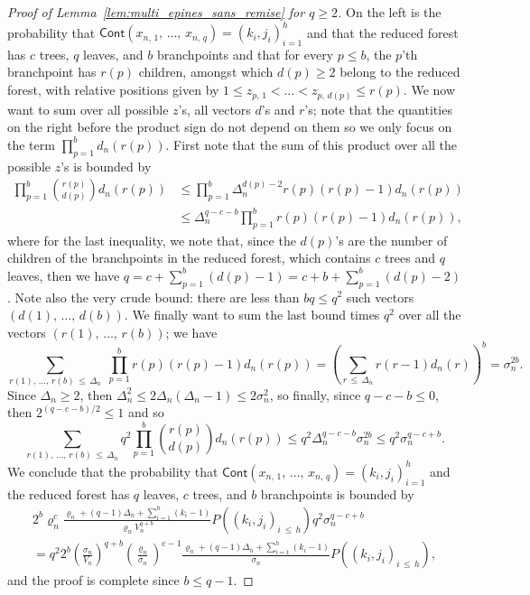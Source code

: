 \documentclass[AHL,Unicode,longabstracts,published]{cedram}
\newcommand{\1}{\ensembles{1}}
\renewcommand{\le}{\leqslant}
\renewcommand{\ge}{\geqslant}
\newcommand{\Cont}{\mathsf{Cont}}
\newcommand{\vertices}{V}
\begin{document}
\begin{proof}[Proof of Lemma~\ref{lem:multi_epines_sans_remise} for $q \ge 2$]
On the left is the probability that $\Cont(x_{n,\,1}, \,\dots,\,x_{n,\,q}) = (k_i, j_i)_{i=1}^h$ and that the reduced forest has $c$ trees, $q$ leaves, and $b$ branchpoints and that for every $p \le b$, the $p$'th branchpoint has $r(p)$ children, amongst which $d(p) \ge 2$ belong to the reduced forest, with relative positions given by $1 \le z_{p,\,1} < \dots < z_{p,\,d(p)} \le r(p)$. We now want to sum over all possible $z$'s, all vectors $d$'s and $r$'s; note that the quantities on the right before the product sign do not depend on them so we only focus on the term $\prod_{p=1}^b d_n(r(p))$. First note that the sum of this product over all the possible $z$'s is bounded by
\begin{align*}
\prod_{p=1}^b \binom{r(p)}{d(p)} d_n(r(p)) &\le \prod_{p=1}^b \Delta_n^{d(p)-2} r(p)(r(p) - 1) d_n(r(p))
\\
&\le \Delta_n^{q - c - b} \prod_{p=1}^b r(p)(r(p) - 1) d_n(r(p)),
\end{align*}
where for the last inequality, we note that, since the $d(p)$'s are the number of children of the branchpoints in the reduced forest, which contains $c$ trees and $q$ leaves, then we have $q = c + \sum_{p=1}^b (d(p)-1) = c + b + \sum_{p=1}^b (d(p)-2)$. Note also the very crude bound: there are less than $b q \le q^2$ such vectors $(d(1),\,\dots,\,d(b))$. We finally want to sum the last bound times $q^2$ over all the vectors $(r(1),\,\dots,\, r(b))$; we have
\[
\sum_{r(1),\,\dots,\,r(b)\,\le\,\Delta_n}\;\prod_{p=1}^b r(p)\left(r(p) - 1\right) d_n(r(p)) = \left(\sum_{r\,\le\, \Delta_n} r (r-1) d_n(r)\right)^b = \sigma_n^{2b}.
\]
Since $\Delta_n \ge 2$, then $\Delta_n^2 \le 2 \Delta_n (\Delta_n - 1) \le 2\sigma_n^2$, so finally, since $q - c - b \le 0$, then $2^{(q - c - b)/2} \le 1$ and so
\[
\sum_{r(1),\,\dots,\,r(b)\,\le\,\Delta_n} q^2 \prod_{p=1}^b \binom{r(p)}{d(p)} d_n(r(p))
\le q^2 \Delta_n^{q - c - b} \sigma_n^{2b}
\le q^2 \sigma_n^{q - c + b}.
\]
We conclude that the probability that $\Cont(x_{n,\,1}, \,\dots,\,x_{n,\,q}) = (k_i, j_i)_{i=1}^h$ and the reduced forest has $q$ leaves, $c$ trees, and $b$ branchpoints is bounded by
\begin{multline*}
2^b \varrho_n^c \frac{\varrho_n + (q-1) \Delta_n + \sum\limits_{i=1}^h \left(k_i - 1\right)}{\varrho_n \vertices_n^{q+b}} P\left(\left(k_i, j_i\right)_{i\,\le\, h}\right) q^2 \sigma_n^{q - c + b}
\\
= q^2 2^b \left(\frac{\sigma_n}{\vertices_n}\right)^{q+b} \left(\frac{\varrho_n}{\sigma_n}\right)^{c-1} \frac{\varrho_n + (q-1) \Delta_n + \sum_{i=1}^h \left(k_i - 1\right)}{\sigma_n} P\left(\left(k_i, j_i\right)_{i\,\le\,h}\right),
\end{multline*}
and the proof is complete since $b \le q-1$.
\end{proof}




\end{document}
